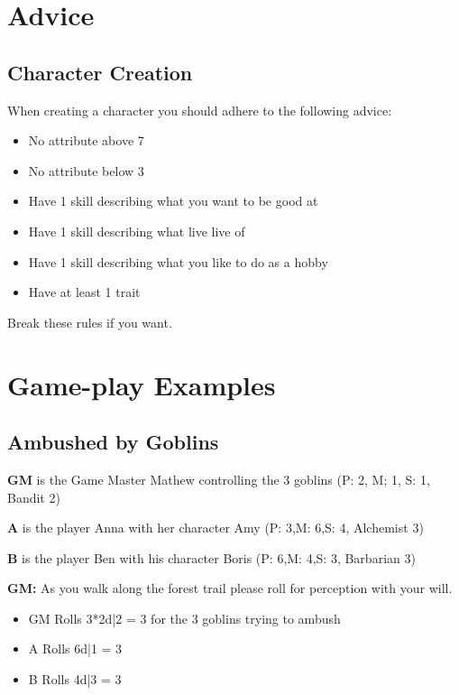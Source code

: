 \documentclass[11pt]{article}
\begin{document}
{\begin{multicols}{2}[]
\section{Advice}
\label{sec:orgf0b0b42}

\subsection{Character Creation}
\label{sec:orgaff2724}

When creating a character you should adhere to the following advice:
\begin{itemize}
\item No attribute above 7
\item No attribute below 3
\item Have 1 skill describing what you want to be good at
\item Have 1 skill describing what live live of
\item Have 1 skill describing what you like to do as a hobby
\item Have at least 1 trait
\end{itemize}
Break these rules if you want.

\newpage
\section{Game-play Examples}
\label{sec:orgb2b6d83}

\subsection{Ambushed by Goblins}
\label{sec:org5bd2dbb}

\textbf{GM} is the Game Master Mathew controlling the 3 goblins (P: 2, M; 1, S: 1, Bandit 2)

\textbf{A} is the player Anna with her character Amy (P: 3,M: 6,S: 4, Alchemist 3)

\textbf{B} is the player Ben with his character Boris (P: 6,M: 4,S: 3, Barbarian 3)

\textbf{GM:} As you walk along the forest trail please roll for perception with your will.
\begin{itemize}
\item GM Rolls 3*2d|2 = 3 for the 3 goblins trying to ambush
\item A Rolls 6d|1 =  3
\item B Rolls 4d|3 =  3
\end{itemize}


\end{multicols}}
\end{document}
